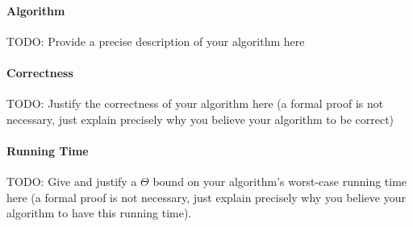\paragraph{Algorithm} TODO: Provide a precise description of your algorithm here

\paragraph{Correctness} TODO: Justify the correctness of your algorithm here (a formal proof is not necessary, just explain precisely why you believe your algorithm to be correct)

\paragraph{Running Time} TODO: Give and justify a $\Theta$ bound on your algorithm's worst-case running time here (a formal proof is not necessary, just explain precisely why you believe your algorithm to have this running time).